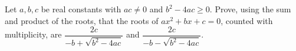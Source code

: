 Let $a,b,c$ be real constants with $ac\ne0$ and $b^2-4ac\ge0$. Prove, using the sum and product of the roots, that the roots of $ax^2+bx+c=0$, counted with multiplicity, are $\dfrac{2c}{-b+\sqrt{b^2-4ac}}$ and $\dfrac{2c}{-b-\sqrt{b^2-4ac}}$.
